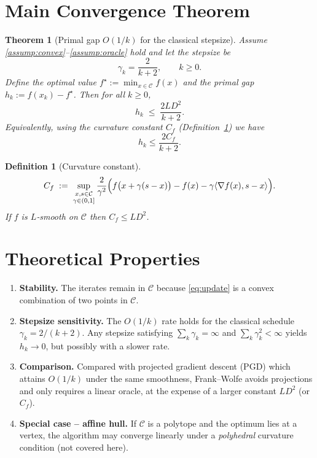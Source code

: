 \documentclass{article}
\newtheorem{theorem}{Theorem}
\newtheorem{definition}{Definition}
\begin{document}
\section*{Main Convergence Theorem}
\begin{theorem}[Primal gap $O(1/k)$ for the classical stepsize]
\label{thm:fw-rate}
Assume \ref{assump:convex}–\ref{assump:oracle} hold and let the stepsize be
\[
\gamma_k = \frac{2}{k+2},\qquad k\ge 0 .
\]
Define the optimal value $f^\star := \min_{x\in\mathcal{C}} f(x)$ and the primal gap $h_k:=f(x_k)-f^\star$. Then for all $k\ge 0$,
\[
h_k \;\le\; \frac{2L D^2}{k+2}.
\tag{2}
\]
Equivalently, using the curvature constant $C_f$ (Definition~\ref{def:curvature}) we have
\[
h_k \le \frac{2 C_f}{k+2}.
\tag{3}
\]
\end{theorem}

\begin{definition}[Curvature constant]\label{def:curvature}
\[
C_f \;:=\; \sup_{\substack{x,s\in\mathcal{C}\\ \gamma\in(0,1]}}
\frac{2}{\gamma^{2}}\Bigl(
f\bigl(x+\gamma(s-x)\bigr)-f(x)-\gamma\langle\nabla f(x),s-x\rangle
\Bigr).
\]
If $f$ is $L$‑smooth on $\mathcal{C}$ then $C_f\le L D^{2}$.
\end{definition}

\section*{Theoretical Properties}
\begin{enumerate}[label=(P\arabic*)]
\item \textbf{Stability.} The iterates remain in $\mathcal{C}$ because \eqref{eq:update} is a convex combination of two points in $\mathcal{C}$.
\item \textbf{Stepsize sensitivity.} The $O(1/k)$ rate holds for the classical schedule $\gamma_k=2/(k+2)$. Any stepsize satisfying $\sum_{k}\gamma_k=\infty$ and $\sum_{k}\gamma_k^2<\infty$ yields $h_k\to0$, but possibly with a slower rate.
\item \textbf{Comparison.} Compared with projected gradient descent (PGD) which attains $O(1/k)$ under the same smoothness, Frank–Wolfe avoids projections and only requires a linear oracle, at the expense of a larger constant $L D^2$ (or $C_f$).
\item \textbf{Special case – affine hull.} If $\mathcal{C}$ is a polytope and the optimum lies at a vertex, the algorithm may converge linearly under a \emph{polyhedral} curvature condition (not covered here).
\end{enumerate}
\end{document}
